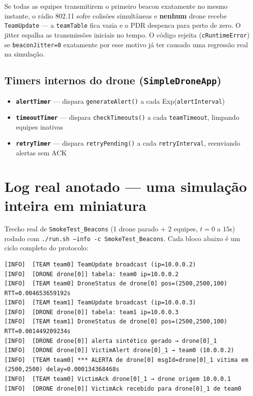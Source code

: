 \documentclass[11pt,a4paper]{article}
\begin{document}
\begin{explica}
Se todas as equipes transmitirem o primeiro beacon exatamente no mesmo
instante, o rádio 802.11 sofre colisões simultâneas e \textbf{nenhum} drone
recebe \texttt{TeamUpdate} --- a \texttt{teamTable} fica vazia e o PDR
despenca para perto de zero. O jitter espalha as transmissões iniciais no
tempo. O código rejeita (\texttt{cRuntimeError}) se \texttt{beaconJitter=0}
exatamente por esse motivo já ter causado uma regressão real na simulação.
\end{explica}

\subsection{Timers internos do drone (\texttt{SimpleDroneApp})}

\begin{itemize}[leftmargin=1.4em]
  \item \textbf{\texttt{alertTimer}} --- dispara \texttt{generateAlert()} a cada Exp(\texttt{alertInterval})
  \item \textbf{\texttt{timeoutTimer}} --- dispara \texttt{checkTimeouts()} a cada \texttt{teamTimeout}, limpando equipes inativas
  \item \textbf{\texttt{retryTimer}} --- dispara \texttt{retryPending()} a cada \texttt{retryInterval}, reenviando alertas sem ACK
\end{itemize}

\newpage
\section{Log real anotado --- uma simulação inteira em miniatura}

Trecho real de \texttt{SmokeTest\_Beacons} (1 drone parado + 2 equipes,
$t=0$ a $15$s) rodado com \texttt{./run.sh --info -c SmokeTest\_Beacons}.
Cada bloco abaixo é um ciclo completo do protocolo:

\begin{lstlisting}[style=simlog]
[INFO]	[TEAM team0] TeamUpdate broadcast (ip=10.0.0.2)
[INFO]	[DRONE drone[0]] tabela: team0 ip=10.0.0.2
[INFO]	[TEAM team0] DroneStatus de drone[0] pos=(2500,2500,100) RTT=0.004653659192s
[INFO]	[TEAM team1] TeamUpdate broadcast (ip=10.0.0.3)
[INFO]	[DRONE drone[0]] tabela: team1 ip=10.0.0.3
[INFO]	[TEAM team1] DroneStatus de drone[0] pos=(2500,2500,100) RTT=0.001449209234s
[INFO]	[DRONE drone[0]] alerta sintético gerado → drone[0]_1
[INFO]	[DRONE drone[0]] VictimAlert drone[0]_1 → team0 (10.0.0.2)
[INFO]	[TEAM team0] *** ALERTA de drone[0] msgId=drone[0]_1 vitima em (2500,2500) delay=0.000134368468s
[INFO]	[TEAM team0] VictimAck drone[0]_1 → drone origem 10.0.0.1
[INFO]	[DRONE drone[0]] VictimAck recebido para drone[0]_1 de team0
\end{lstlisting}
\end{document}
